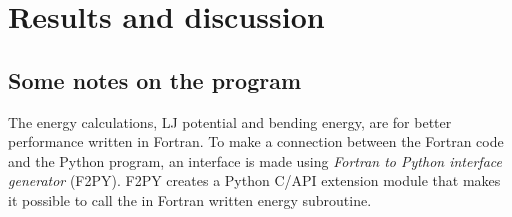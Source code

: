 \section{Results and discussion}

\subsection{Some notes on the program}
The energy calculations, LJ potential and bending energy, are for better performance written in Fortran. To make a connection between the Fortran code and the Python program, an interface is made using \emph{Fortran to Python interface generator} (F2PY). F2PY creates a Python C/API extension module that makes it possible to call the in Fortran written energy subroutine.